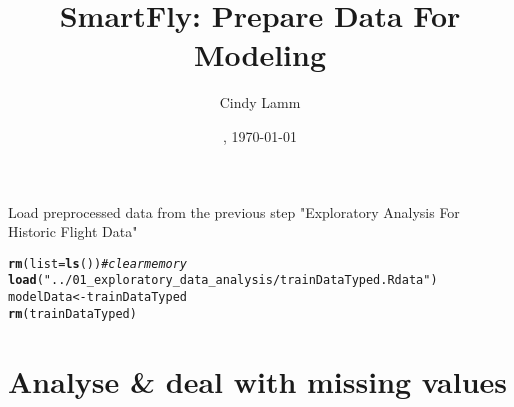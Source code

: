 \documentclass{article}\usepackage[]{graphicx}\usepackage[]{color}
\makeatletter
\newcommand{\hlstr}[1]{\textcolor[rgb]{0.192,0.494,0.8}{#1}}%
\newcommand{\hlcom}[1]{\textcolor[rgb]{0.678,0.584,0.686}{\textit{#1}}}%
\newcommand{\hlstd}[1]{\textcolor[rgb]{0.345,0.345,0.345}{#1}}%
\newcommand{\hlkwb}[1]{\textcolor[rgb]{0.69,0.353,0.396}{#1}}%
\newcommand{\hlkwc}[1]{\textcolor[rgb]{0.333,0.667,0.333}{#1}}%
\newcommand{\hlkwd}[1]{\textcolor[rgb]{0.737,0.353,0.396}{\textbf{#1}}}%
\newenvironment{kframe}{%
 \def\at@end@of@kframe{}%
 \ifinner\ifhmode%
  \def\at@end@of@kframe{\end{minipage}}%
  \begin{minipage}{\columnwidth}%
 \fi\fi%
 \def\FrameCommand##1{\hskip\@totalleftmargin \hskip-\fboxsep
 \colorbox{shadecolor}{##1}\hskip-\fboxsep
     \hskip-\linewidth \hskip-\@totalleftmargin \hskip\columnwidth}%
 \MakeFramed {\advance\hsize-\width
   \@totalleftmargin\z@ \linewidth\hsize
   \@setminipage}}%
 {\par\unskip\endMakeFramed%
 \at@end@of@kframe}
\newenvironment{knitrout}{}{} %
\makeatother
\begin{document}
\date{\currenttime, \today}
\title{SmartFly: Prepare Data For Modeling}
\author{Cindy Lamm}

\maketitle

Load preprocessed data from the previous step "Exploratory Analysis For Historic Flight Data"
\begin{knitrout}
\color{fgcolor}\begin{kframe}
\begin{alltt}
\hlkwd{rm}\hlstd{(}\hlkwc{list}\hlstd{=}\hlkwd{ls}\hlstd{())}   \hlcom{#clear memory}
\hlkwd{load}\hlstd{(}\hlstr{"../01_exploratory_data_analysis/trainDataTyped.Rdata"}\hlstd{)}
\hlstd{modelData} \hlkwb{<-} \hlstd{trainDataTyped}
\hlkwd{rm}\hlstd{(trainDataTyped)}
\end{alltt}
\end{kframe}
\end{knitrout}

\section{Analyse \& deal with missing values}
\end{document}

